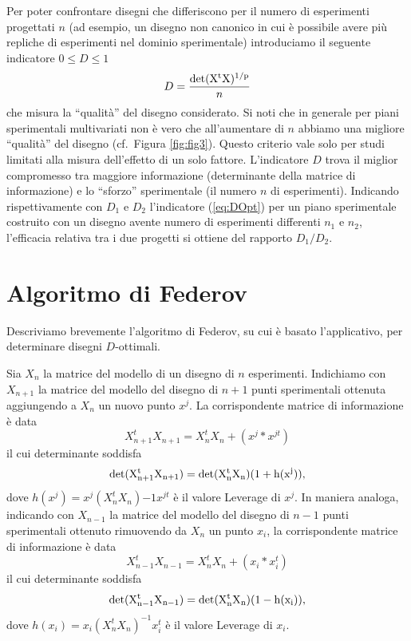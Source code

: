 \documentclass[
  11pt,
]{book}
\begin{document}
Per poter confrontare disegni che differiscono per il numero di esperimenti progettati \(n\) (ad esempio, un disegno non canonico in cui è possibile avere più repliche di esperimenti nel dominio sperimentale) introduciamo il seguente indicatore \(0 \leq D \leq 1\)
\begin{equation}
    D=\frac{\rm{det}(X^tX)^{1/p}}{n}
    \label{eq:DOpt}
\end{equation}
che misura la ``qualità'' del disegno considerato. Si noti che in generale per piani sperimentali multivariati non è vero che all'aumentare di \(n\) abbiamo una migliore ``qualità'' del disegno (cf.~Figura \ref{fig:fig3}). Questo criterio vale solo per studi limitati alla misura dell'effetto di un solo fattore. L'indicatore \(D\) trova il miglior compromesso tra maggiore informazione (determinante della matrice di informazione) e lo ``sforzo'' sperimentale (il numero \(n\) di esperimenti).\newline
Indicando rispettivamente con \(D_1\) e \(D_2\) l'indicatore (\ref{eq:DOpt}) per un piano sperimentale costruito con un disegno avente numero di esperimenti differenti \(n_1\) e \(n_2\), l'efficacia relativa tra i due progetti si ottiene del rapporto \(D_1/D_2\).

\hypertarget{algoritmo-di-federov}{%
\section{Algoritmo di Federov}\label{algoritmo-di-federov}}

Descriviamo brevemente l'algoritmo di Federov, su cui è basato l'applicativo, per determinare disegni \(D\)-ottimali.

Sia \(X_n\) la matrice del modello di un disegno di \(n\) esperimenti. Indichiamo con \(X_{n+1}\) la matrice del modello del disegno di \(n+1\) punti sperimentali ottenuta aggiungendo a \(X_n\) un nuovo punto \(x^j\). La corrispondente matrice di informazione è data
\begin{equation*}
    X^t_{n+1}X_{n+1}=X^t_nX_n+(x^j*x^{jt})
\end{equation*}
il cui determinante soddisfa
\begin{equation*}
    \rm{det}(X^t_{n+1}X_{n+1})=\rm{det}(X^t_nX_n)(1+h(x^j)),
\end{equation*}
dove \(h(x^j)=x^j(X^t_nX_n){-1}x^{jt}\) è il valore Leverage di \(x^j\). \newline
In maniera analoga, indicando con \(X_{n-1}\) la matrice del modello del disegno di \(n-1\) punti sperimentali ottenuto rimuovendo da \(X_n\) un punto \(x_i\), la corrispondente matrice di informazione è data
\begin{equation*}
    X^t_{n-1}X_{n-1}=X^t_nX_n+(x_i*x^t_i)
\end{equation*}
il cui determinante soddisfa
\begin{equation*}
    \rm{det}(X^t_{n-1}X_{n-1})=\rm{det}(X^t_nX_n)(1-h(x_i)),
\end{equation*}
dove \(h(x_i)=x_i(X^t_nX_n)^{-1}x^t_i\) è il valore Leverage di \(x_i\).
\end{document}
